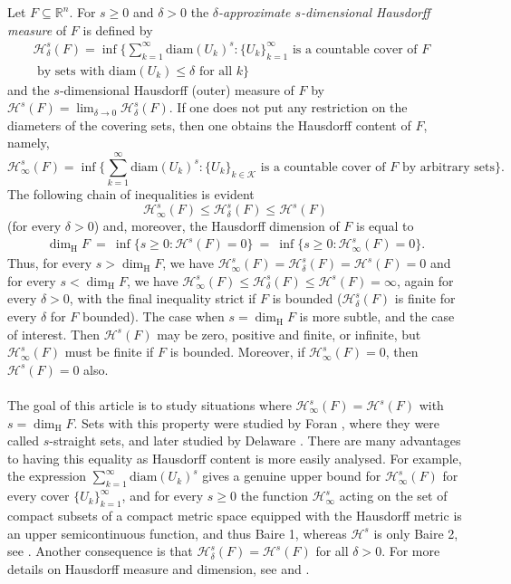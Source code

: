 \documentclass[11pt,english,british]{article}
\numberwithin{equation}{section}
\renewcommand{\geq}{\geqslant}
\renewcommand{\leq}{\leqslant}
\begin{document}
Let $F \subseteq \mathbb{R}^n$.  For $s \geq 0$ and $\delta>0$ the \emph{$\delta$-approximate $s$-dimensional Hausdorff measure} of $F$ is defined by
\begin{eqnarray*}
\mathcal{H}_\delta^s (F) = \inf \bigg\{ \sum_{k=1}^{\infty} \text{diam}( U_k)^s : \{ U_k\}_{k=1}^{\infty} \text{ is a countable cover of $F$ }\\ 
  \text{   by sets with $\text{diam}(U_k) \leq \delta$ for all $k$} \bigg\}
\end{eqnarray*}
and the $s$-dimensional Hausdorff (outer) measure of $F$ by $\mathcal{H}^s (F) = \lim_{\delta \to 0} \mathcal{H}_\delta^s (F)$.  If one does not put any restriction on the diameters of the covering sets, then one obtains the Hausdorff content of $F$, namely,
\[
\mathcal{H}_\infty^s (F) = \inf \bigg\{ \sum_{k=1}^{\infty} \text{diam}( U_k)^s : \{ U_k\}_{k \in \mathcal{K}} \text{ is a countable cover of $F$ by arbitrary sets} \bigg\}.
\]
The following chain of inequalities is evident
\[
\mathcal{H}_\infty^s (F) \leq \mathcal{H}_\delta^s (F) \leq \mathcal{H}^s (F) 
\]
(for every $\delta>0$) and, moreover, the Hausdorff dimension of $F$ is equal to 
\begin{eqnarray*}
\dim_\text{H} F   \ = \ \inf \Big\{ s \geq 0: \mathcal{H}^s (F) =0 \Big\}  \ = \  \inf \Big\{ s \geq 0: \mathcal{H}^s_\infty (F) =0 \Big\}.
\end{eqnarray*}
Thus, for every $s> \dim_\text{H} F$, we have $ \mathcal{H}^s_\infty (F) =  \mathcal{H}^s_\delta (F) =  \mathcal{H}^s (F) =0$ and for every $s< \dim_\text{H} F$, we have $ \mathcal{H}_\infty^s (F) \leq  \mathcal{H}^s_\delta (F) \leq  \mathcal{H}^s (F) = \infty$, again for every $\delta>0$, with the final inequality strict if $F$ is bounded ($\mathcal{H}^s_\delta(F)$ is finite for every $\delta$ for $F$ bounded).  The case when $s =\dim_\text{H} F$ is more subtle, and the case of interest.  Then $\mathcal{H}^s (F)$ may be zero, positive and finite, or infinite, but $\mathcal{H}^s_\infty (F)$ must be finite if $F$ is bounded.  Moreover, if $\mathcal{H}^s_\infty (F) = 0$, then $\mathcal{H}^s (F) = 0$ also.  
\\ \\
The goal of this article is to study situations where $\mathcal{H}^s_\infty(F) = \mathcal{H}^s (F) $ with $s=\dim_\text{H} F$.  Sets with this property were studied by Foran \cite{foran}, where they were called $s$-straight sets, and later studied by Delaware \cite{delaware0, delaware}. There are many advantages to having this equality as Hausdorff content is more easily analysed.  For example, the expression  $\sum_{k=1}^{\infty} \text{diam}( U_k)^s$ gives a genuine upper bound for $\mathcal{H}^s_\infty(F)$ for every cover $\{U_k\}_{k=1}^{\infty}$, and for every $s \geq 0$ the function $\mathcal{H}^s_\infty$ acting on the set of compact subsets of a compact metric space equipped with the Hausdorff metric is an upper semicontinuous function, and thus Baire 1, whereas $\mathcal{H}^s$ is only Baire 2, see \cite{mattilamauldin}.  Another consequence is that $ \mathcal{H}_\delta^s (F) =  \mathcal{H}^s (F)$ for all $\delta>0$.  For more details on Hausdorff measure and dimension, see \cite[Chapter 3]{falconer} and \cite{rogers}.
\end{document}
